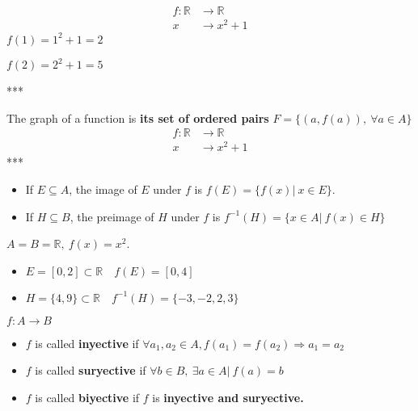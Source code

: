\documentclass[12pt, a4paper]{book}
\begin{document}
\begin{exmp}
  \begin{align*}
    f:\mathbb{R} &\longrightarrow \mathbb{R} \\
    x &\longrightarrow x^2+1
  \end{align*}
  $f(1) = 1^2+1 = 2$

  $f(2) = 2^2+1 = 5$

  ***
\end{exmp}

\begin{defn}
  The graph of a function is \textbf{its set of ordered pairs} \boldmath $F=\{(a,f(a)),\ \forall a\in A\}$
  \begin{align*}
    f:\mathbb{R} &\longrightarrow \mathbb{R} \\
    x &\longrightarrow x^2+1
  \end{align*}
  \unboldmath
  ***
\end{defn}

\begin{defn}
  \begin{itemize}
    \item If $E \subseteq A$, the image of $E$ under $f$ is $f(E) = \{f(x)\vert\ x\in E\}$.
    \item If $H \subseteq B$, the preimage of $H$ under $f$ is $f^{-1}(H) = \{x\in A\vert\ f(x)\in H\}$
  \end{itemize}
\end{defn}

\begin{exmp}
  $A=B=\mathbb{R},\ f(x) = x^2$.
  \begin{itemize}
    \item $E = [0,2] \subset \mathbb{R} \quad f(E) = [0,4]$
    \item $H = \{4,9\} \subset \mathbb{R} \quad f^{-1}(H) = \{-3,-2,2,3\}$
  \end{itemize}
\end{exmp}

\begin{defn}
  \boldmath
  $f:A\longrightarrow B$
  \begin{itemize}
    \item $f$ is called \textbf{inyective} if $\forall a_1,a_2 \in A, f(a_1)=f(a_2) \Rightarrow a_1=a_2$
    \item $f$ is called \textbf{suryective} if $\forall b \in B,\ \exists a\in A \vert\ f(a)=b$
    \item $f$ is called \textbf{biyective} if $f$ is \textbf{inyective and suryective.}
  \end{itemize}
  \unboldmath
\end{defn}
\end{document}
